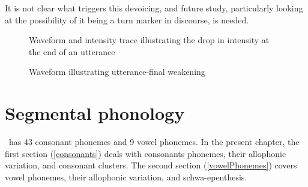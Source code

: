 It is not clear what triggers this devoicing, and future study, particularly looking at the possibility of it being a turn marker in discourse, is needed.

\FB

\begin{figure}
\caption{Waveform and intensity trace illustrating the drop in intensity at the end of an utterance}\label{intonationGraphic}
\end{figure}

\begin{figure}
\caption{Waveform illustrating utterance-final weakening}\label{utteranceFinalDevoicingGraphic}
\end{figure}



\chapter{Segmental phonology}\label{csANDvs}
\PS\ has 43 consonant phonemes and 9 vowel phonemes. In the present chapter, the first section (\SEC\ref{consonants}) deals with consonants phonemes, their allophonic variation, and consonant clusters. 
The second section (\SEC\ref{vowelPhonemes}) covers vowel phonemes, their allophonic variation, and schwa-epenthesis. 

